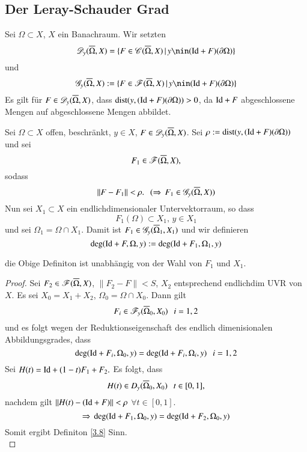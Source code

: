 \subsection{Der Leray-Schauder Grad}

Sei $\Omega\subset X$, $X$ ein Banachraum. Wir setzten
\[
    \ms D_y(\ol \Omega,X)=\{ F\in \ms C(\ol\Omega,X)\, | \, y\nin(\Id + F)(\partial \Omega) \}
\]
und
\[
    \ms G_y(\ol\Omega,X):=\{F\in \ms F(\ol \Omega,X)\, |\, y\nin(\Id+F)(\partial\Omega)\}
\]
Es gilt für $F\in \mathscr D_y(\overline \Omega,X)$, dass $\mathrm{dist}(y,(\mathrm{Id}+F)(\partial\Omega))>0$, da $\mathrm{Id}+F$
abgeschlossene Mengen auf abgeschlossene Mengen abbildet.

\begin{defi}{\label{3.8}}
    Sei $\Omega\subset X$ offen, beschränkt, $y\in X$, $F\in \mathscr D_y(\overline \Omega,X)$. Sei $\rho:=
    \mathrm{dist}(y,(\mathrm{Id}+F)(\partial \Omega))$ und sei
    \[
        F_1\in \mathscr F(\overline \Omega, X),
    \]
    sodass
    \[
        \|F-F_1\|<\rho. \hspace{.25cm} (\Rightarrow \, F_1\in \mathscr G_y(\overline \Omega,X))
    \]
    Nun sei $X_1\subset X$ ein endlichdimensionaler Untervektorraum, so dass
    \[
        F_1(\Omega)\subset X_1,\, y\in X_1
    \] 
    und sei $\Omega_1=\Omega\cap X_1$. Damit ist $F_1\in \mathscr G_y(\overline\Omega_1,X_1)$ und wir definieren
    \[
        \deg(\mathrm{Id}+F,\Omega,y):=\deg(\mathrm{Id}+F_1,\Omega_1,y)
    \]
\end{defi}

\begin{prop}\label{3.9}
    die Obige Definiton ist unabhängig von der Wahl von $F_1$ und $X_1$.
\end{prop}

\begin{proof}
    Sei $F_2\in \mathscr F (\overline \Omega,X)$, $\|F_2-F\|<S$, $X_2$ entsprechend endlichdim UVR von $X$. Es sei
    $X_0=X_1+X_2$, $\Omega_0=\Omega\cap X_0$. Dann gilt
    \[
        F_i\in \mathscr F_y(\overline\Omega_0,X_0) \hspace{.25cm} i=1,2
    \]
    und es folgt wegen der Reduktionseigenschaft des endlich dimenisionalen Abbildungsgrades, dass
    \[
        \deg(\mathrm{Id} + F_i,\Omega_0,y)=\deg(\mathrm{Id}+F_i,\Omega_i,y)\hspace{.25cm} i=1,2
    \]
    Sei $H(t)=\mathrm{Id} + (1-t)F_1+F_2.$ Es folgt, dass
    \[
        H(t)\in D_y(\overline\Omega_0,X_0) \hspace{.25cm} t\in [0,1],
    \]
    nachdem gilt $\|H(t)-(\mathrm{Id}+F)\|<\rho$ $\forall t\in [0,1]$.
    \[
        \Rightarrow \, \deg(\mathrm{Id}+F_1,\Omega_0,y)=\deg(\mathrm{Id}+F_2,\Omega_0,y)
    \]
    Somit ergibt Definiton \ref{3.8} Sinn.
    \[ \]
\end{proof}

